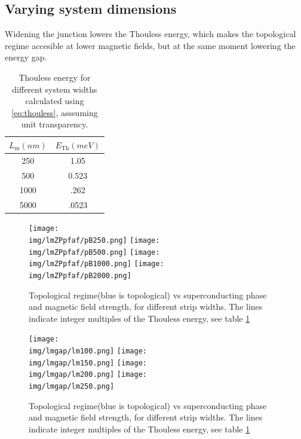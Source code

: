 \documentclass[10pt,a4paper]{article}
\newcommand{\img}{./images}
\begin{document}
	\subsection{Varying system dimensions}
		Widening the junction lowers the Thouless energy, which makes the topological regime accesible at lower magnetic fields, but at the same moment lowering the energy gap.
			\begin{table}[H]
				\centering
				\begin{tabular}{|c|c|}
					\hline 
					$L_\text{m} (nm)$ & $E_\text{Th} (meV)$ \\ 
					\hline 
					250 & 1.05 \\ 
					\hline 
					500 & 0.523 \\ 
					\hline 
					1000 & .262 \\ 
					\hline 
					5000 & .0523 \\ 
					\hline 
				\end{tabular} 
				\caption{Thouless energy for different system widths calculated using \ref{eq:thouless}, asssuming unit transparency.}
				\label{table:thouless}
			\end{table}

			\begin{figure}[H]
				\texttt{[image: \\img/lmZPpfaf/pB250.png]}
				\texttt{[image: \\img/lmZPpfaf/pB500.png]}
				\texttt{[image: \\img/lmZPpfaf/pB1000.png]}
				\texttt{[image: \\img/lmZPpfaf/pB2000.png]}
				\caption{Topological regime(blue is topological) vs superconducting phase and magnetic field strength, for different strip widths. The lines indicate integer multiples of the Thouless energy, see table \ref{table:thouless}}
			\end{figure}
		
			\begin{figure}[H]
				\texttt{[image: \\img/lmgap/lm100.png]}
				\texttt{[image: \\img/lmgap/lm150.png]}
				\texttt{[image: \\img/lmgap/lm200.png]}
				\texttt{[image: \\img/lmgap/lm250.png]}
				\caption{Topological regime(blue is topological) vs superconducting phase and magnetic field strength, for different strip widths. The lines indicate integer multiples of the Thouless energy, see table \ref{table:thouless}}
			\end{figure}
\clearpage
\printglossaries
\end{document}
